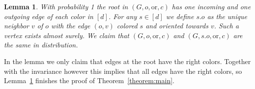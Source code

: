 \documentclass[11pt]{article}
\newtheorem{lemm}[theo]{Lemma}
\theoremstyle{definition}
\numberwithin{equation}{section}
\numberwithin{figure}{section}
\numberwithin{table}{section}
\newcommand{\orl}{\mathrm{or}}
\begin{document}
\begin{lemm}\label{lemma:invariant_schreier_limit}
With probability 1 the root in $(G,o,\orl, c)$ has one incoming and one outgoing edge of each color in $[d]$. For any $s \in [d]$ we define $s.o$ as the unique neighbor $v$ of $o$ with the edge $(o,v)$ colored $s$ and oriented towards $v$. Such a vertex exists almost surely. We claim that $(G,o,\orl,c)$ and $(G,s.o,\orl,c)$ are the same in distribution.
\end{lemm}

In the lemma we only claim that edges at the root have the right colors. Together with the invariance however this implies that all edges have the right colors, so Lemma~\ref{lemma:invariant_schreier_limit} finishes the proof of Theorem~\ref{theorem:main}.

\end{document}
